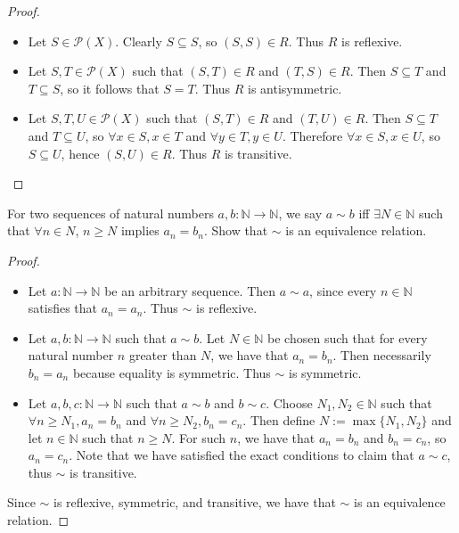 \documentclass[12pt]{article}
\newcommand{\N}{\mathbb{N}}
\newcommand{\Pset}[1]{\mathcal{P}(#1)}
\newenvironment{ex}[2][Problem]{\begin{trivlist}
\item[\hskip \labelsep {\bfseries #1}\hskip \labelsep {\bfseries #2.}]}{\end{trivlist}}
\begin{document}
\begin{proof} $ $
\begin{itemize}
    \item Let $S\in\Pset{X}$. Clearly $S\subseteq S$, so $(S, S)\in R$. Thus $R$ is reflexive.
    \item Let $S, T\in\Pset{X}$ such that $(S, T)\in R$ and
        $(T, S)\in R$. Then $S\subseteq T$ and $T\subseteq S$, so it follows that $S=T$. Thus $R$ is antisymmetric.
    \item Let $S, T, U\in\Pset{X}$ such that $(S, T)\in R$ and
        $(T, U)\in R$. Then $S\subseteq T$ and $T\subseteq U$, so
        $\forall x \in S, x\in T$ and $\forall y \in T, y\in U$.
        Therefore $\forall x \in S, x\in U$, so $S\subseteq U$, hence $(S, U)\in R$.
        Thus $R$ is transitive.
\end{itemize}
\end{proof}


\begin{ex}{5} [Sequences being eventually equal is an equivalence relation]
    For two sequences of natural numbers $a, b : \N\to\N$, we say $a\sim b$ iff
    $\exists N \in \N$ such that $\forall n \in N$, $n\ge N$ implies $a_n = b_n$.
    Show that $\sim$ is an equivalence relation.
\end{ex}

\begin{proof} $ $
    \begin{itemize}
        \item Let $a:\N\to\N$ be an arbitrary sequence. Then $a\sim a$, since
            every $n\in\N$ satisfies that $a_n=a_n$. Thus $\sim$ is reflexive.
        \item Let $a, b:\N\to\N$ such that $a\sim b$. Let $N\in\N$ be chosen
            such that for every natural number $n$ greater than $N$, we have
            that $a_n=b_n$. Then necessarily $b_n=a_n$ because equality is symmetric.
            Thus $\sim$ is symmetric.
        \item Let $a, b, c:\N\to\N$ such that $a\sim b$ and $b\sim c$. Choose
            $N_1, N_2\in\N$ such that $\forall n\ge N_1, a_n=b_n$ and
            $\forall n\ge N_2, b_n=c_n$. Then define $N:=\max\{N_1,N_2\}$
            and let $n\in\N$ such that $n\ge N$. For such $n$, we have that
            $a_n=b_n$ and $b_n=c_n$, so $a_n=c_n$. Note that we have satisfied the exact
            conditions to claim that $a\sim c$, thus $\sim$ is transitive.

    \end{itemize}

    Since $\sim$ is reflexive, symmetric, and transitive, we have that $\sim$ is an
    equivalence relation.
\end{proof}
\end{document}
